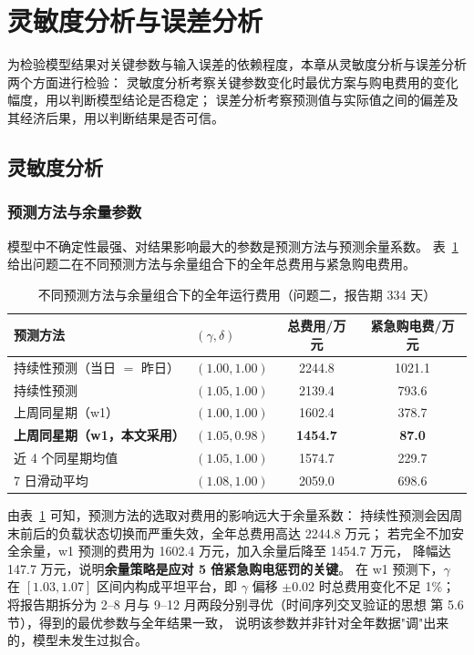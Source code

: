\section{灵敏度分析与误差分析}

为检验模型结果对关键参数与输入误差的依赖程度，本章从灵敏度分析与误差分析两个方面进行检验：
灵敏度分析考察关键参数变化时最优方案与购电费用的变化幅度，用以判断模型结论是否稳定；
误差分析考察预测值与实际值之间的偏差及其经济后果，用以判断结果是否可信。

\subsection{灵敏度分析}

\subsubsection{预测方法与余量参数}
模型中不确定性最强、对结果影响最大的参数是预测方法与预测余量系数。
表~\ref{tab:sens-q2} 给出问题二在不同预测方法与余量组合下的全年总费用与紧急购电费用。

\begin{table}[!htbp]
\caption{不同预测方法与余量组合下的全年运行费用（问题二，报告期 334 天）}\label{tab:sens-q2}
\centering
\small
\setlength{\tabcolsep}{5pt}
\begin{tabular}{llcc}
\toprule
预测方法 & $(\gamma,\delta)$ & 总费用/万元 & 紧急购电费/万元 \\
\midrule
持续性预测（当日 $=$ 昨日） & $(1.00,1.00)$ & 2244.8 & 1021.1 \\
持续性预测 & $(1.05,1.00)$ & 2139.4 & 793.6 \\
上周同星期（w1） & $(1.00,1.00)$ & 1602.4 & 378.7 \\
\textbf{上周同星期（w1，本文采用）} & $\bm{(1.05,0.98)}$ & \textbf{1454.7} & \textbf{87.0} \\
近 4 个同星期均值 & $(1.05,1.00)$ & 1574.7 & 229.7 \\
7 日滑动平均 & $(1.08,1.00)$ & 2059.0 & 698.6 \\
\bottomrule
\end{tabular}
\end{table}

由表~\ref{tab:sens-q2} 可知，预测方法的选取对费用的影响远大于余量系数：
持续性预测会因周末前后的负载状态切换而严重失效，全年总费用高达 2244.8 万元；
若完全不加安全余量，w1 预测的费用为 1602.4 万元，加入余量后降至 1454.7 万元，
降幅达 147.7 万元，说明\textbf{余量策略是应对 5 倍紧急购电惩罚的关键}。
在 w1 预测下，$\gamma$ 在 $[1.03,1.07]$ 区间内构成平坦平台，即 $\gamma$ 偏移 $\pm0.02$ 时总费用变化不足 1\%；
将报告期拆分为 2--8 月与 9--12 月两段分别寻优（时间序列交叉验证的思想\cite{fpp3} 第 5.6 节），得到的最优参数与全年结果一致，
说明该参数并非针对全年数据"调"出来的，模型未发生过拟合。

